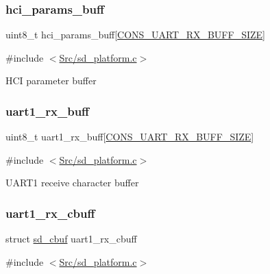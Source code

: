 \subsubsection{\texorpdfstring{hci\+\_\+params\+\_\+buff}{hci\_params\_buff}}
{\footnotesize\ttfamily uint8\+\_\+t hci\+\_\+params\+\_\+buff\mbox{[}\mbox{\hyperlink{group___s_d___platform___defines_gaf42bf8bfc63a6cca851012eeb8e25b52}{C\+O\+N\+S\+\_\+\+U\+A\+R\+T\+\_\+\+R\+X\+\_\+\+B\+U\+F\+F\+\_\+\+S\+I\+ZE}}\mbox{]}}



{\ttfamily \#include $<$\mbox{\hyperlink{sd__platform_8c}{Src/sd\+\_\+platform.\+c}}$>$}

H\+CI parameter buffer \mbox{\label{group___s_d___platform___variables_ga51337e7af0399a1e581d3d5f4f36e339}} 
\subsubsection{\texorpdfstring{uart1\+\_\+rx\+\_\+buff}{uart1\_rx\_buff}}
{\footnotesize\ttfamily uint8\+\_\+t uart1\+\_\+rx\+\_\+buff\mbox{[}\mbox{\hyperlink{group___s_d___platform___defines_gaf42bf8bfc63a6cca851012eeb8e25b52}{C\+O\+N\+S\+\_\+\+U\+A\+R\+T\+\_\+\+R\+X\+\_\+\+B\+U\+F\+F\+\_\+\+S\+I\+ZE}}\mbox{]}}



{\ttfamily \#include $<$\mbox{\hyperlink{sd__platform_8c}{Src/sd\+\_\+platform.\+c}}$>$}

U\+A\+R\+T1 receive character buffer \mbox{\label{group___s_d___platform___variables_gaf4d9d903e4183910ee6764d902948a15}} 
\subsubsection{\texorpdfstring{uart1\+\_\+rx\+\_\+cbuff}{uart1\_rx\_cbuff}}
{\footnotesize\ttfamily struct \mbox{\hyperlink{structsd__cbuf}{sd\+\_\+cbuf}} uart1\+\_\+rx\+\_\+cbuff}



{\ttfamily \#include $<$\mbox{\hyperlink{sd__platform_8c}{Src/sd\+\_\+platform.\+c}}$>$}

